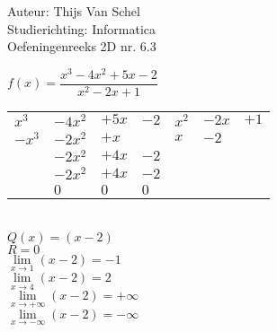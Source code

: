 \documentclass[a4paper]{article}
\begin{document}
  
\noindent \large Auteur: Thijs Van Schel \\
\noindent \large Studierichting: Informatica\\
\noindent \large Oefeningenreeks 2D nr. 6.3\\

\medskip

\normalsize

$f(x) = \dfrac{x^3-4x^2+5x-2}{x^2-2x+1}$ \\

\begin{tabular}{llll|lll}
$x^3$ & $-4x^2$ & $+5x$ & $-2$ & $x^2$ & $-2x$ & $+1$ \\ \cline{5-7}
$-x^3$ & $-2x^2$ & $+x$ & & $x$ & $-2$ &  \\ \cline{1-3}
& $-2x^2$ & $+4x$ & $-2$ & & & \\
& $-2x^2$ & $+4x$ & $-2$ & & & \\ \cline{2-4}
& $0$ & $0$ & $0$ & & & \\
\end{tabular} \\

$Q(x) = (x-2)$ \\

$R = 0$ \\

$\lim\limits_{x\rightarrow1}(x-2)=-1$ \\

$\lim\limits_{x\rightarrow4}(x-2)=2$ \\

$\lim\limits_{x\rightarrow+\infty}(x-2)=+\infty$ \\

$\lim\limits_{x\rightarrow-\infty}(x-2)=-\infty$

\begin{thebibliography}{999}
\end{thebibliography}
\end{document}
